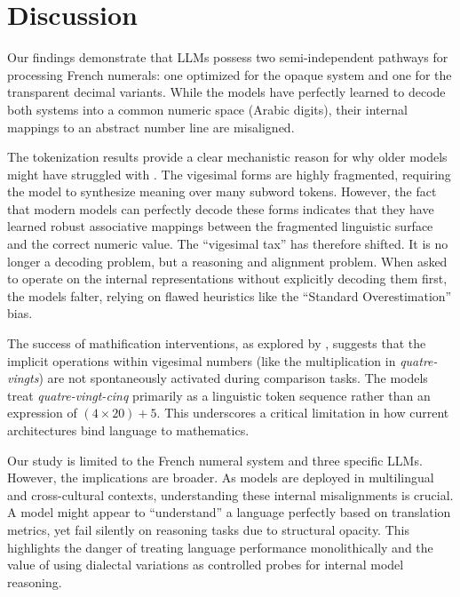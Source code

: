 \section{Discussion}

Our findings demonstrate that LLMs possess two semi-independent pathways for processing French numerals: one optimized for the opaque \standardfrench system and one for the transparent decimal variants. While the models have perfectly learned to decode both systems into a common numeric space (Arabic digits), their internal mappings to an abstract number line are misaligned.

The tokenization results provide a clear mechanistic reason for why older models might have struggled with \standardfrench. The vigesimal forms are highly fragmented, requiring the model to synthesize meaning over many subword tokens. However, the fact that modern models can perfectly decode these forms indicates that they have learned robust associative mappings between the fragmented linguistic surface and the correct numeric value. The ``vigesimal tax'' has therefore shifted. It is no longer a decoding problem, but a reasoning and alignment problem. When asked to operate on the internal representations without explicitly decoding them first, the models falter, relying on flawed heuristics like the ``Standard Overestimation'' bias.

The success of mathification interventions, as explored by \citet{bhattacharya2025investigating}, suggests that the implicit operations within vigesimal numbers (like the multiplication in \textit{quatre-vingts}) are not spontaneously activated during comparison tasks. The models treat \textit{quatre-vingt-cinq} primarily as a linguistic token sequence rather than an expression of $(4 \times 20) + 5$. This underscores a critical limitation in how current architectures bind language to mathematics.

Our study is limited to the French numeral system and three specific LLMs. However, the implications are broader. As models are deployed in multilingual and cross-cultural contexts, understanding these internal misalignments is crucial. A model might appear to ``understand'' a language perfectly based on translation metrics, yet fail silently on reasoning tasks due to structural opacity. This highlights the danger of treating language performance monolithically and the value of using dialectal variations as controlled probes for internal model reasoning.